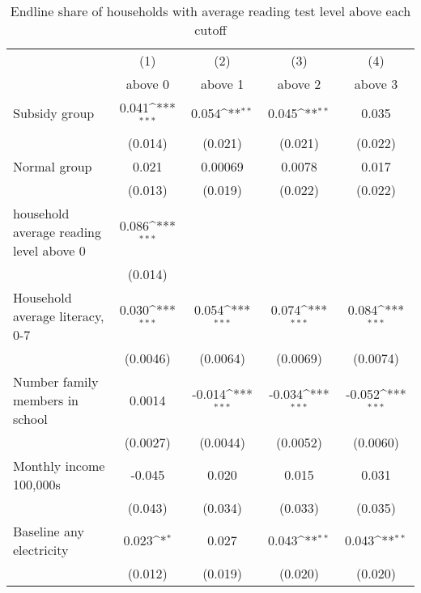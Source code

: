 \begin{table}[htbp]\centering
\def\sym#1{\ifmmode^{#1}\else\(^{#1}\)\fi}
\caption{Endline share of households with average reading test level above each cutoff}
\begin{tabular*}{1\hsize}{@{\hskip\tabcolsep\extracolsep\fill}l*{4}{c}}
\toprule
                &\multicolumn{1}{c}{(1)}&\multicolumn{1}{c}{(2)}&\multicolumn{1}{c}{(3)}&\multicolumn{1}{c}{(4)}\\
                &\multicolumn{1}{c}{above 0}&\multicolumn{1}{c}{above 1}&\multicolumn{1}{c}{above 2}&\multicolumn{1}{c}{above 3}\\
\midrule
Subsidy group   &    0.041\sym{***}&    0.054\sym{**} &    0.045\sym{**} &    0.035         \\
                &  (0.014)         &  (0.021)         &  (0.021)         &  (0.022)         \\
Normal group    &    0.021         &  0.00069         &   0.0078         &    0.017         \\
                &  (0.013)         &  (0.019)         &  (0.022)         &  (0.022)         \\
household average reading level above 0&    0.086\sym{***}&                  &                  &                  \\
                &  (0.014)         &                  &                  &                  \\
Household average literacy, 0-7&    0.030\sym{***}&    0.054\sym{***}&    0.074\sym{***}&    0.084\sym{***}\\
                & (0.0046)         & (0.0064)         & (0.0069)         & (0.0074)         \\
Number family members in school&   0.0014         &   -0.014\sym{***}&   -0.034\sym{***}&   -0.052\sym{***}\\
                & (0.0027)         & (0.0044)         & (0.0052)         & (0.0060)         \\
Monthly income 100,000s&   -0.045         &    0.020         &    0.015         &    0.031         \\
                &  (0.043)         &  (0.034)         &  (0.033)         &  (0.035)         \\
Baseline any electricity&    0.023\sym{*}  &    0.027         &    0.043\sym{**} &    0.043\sym{**} \\
                &  (0.012)         &  (0.019)         &  (0.020)         &  (0.020)         \\

\end{tabular*}
\end{table}
